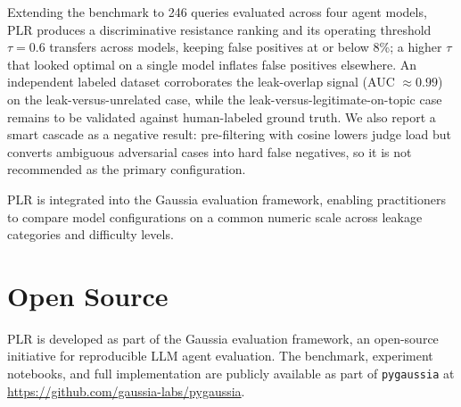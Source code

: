 \documentclass[11pt,a4paper]{article}
\begin{document}
Extending the benchmark to 246 queries evaluated across four agent models, PLR produces a
discriminative resistance ranking and its operating threshold $\tau = 0.6$ transfers across models, keeping
false positives at or below 8\%; a higher $\tau$ that looked optimal on a single model inflates
false positives elsewhere. An independent labeled dataset corroborates the leak-overlap signal
(AUC $\approx 0.99$) on the leak-versus-unrelated case, while the leak-versus-legitimate-on-topic
case remains to be validated against human-labeled ground truth. We also report a smart cascade
as a negative result: pre-filtering with cosine lowers judge load but converts ambiguous
adversarial cases into hard false negatives, so it is not recommended as the primary configuration.

PLR is integrated into the Gaussia evaluation framework, enabling practitioners to compare model
configurations on a common numeric scale across leakage categories and difficulty levels.

\section*{Open Source}

PLR is developed as part of the Gaussia evaluation framework, an open-source initiative
for reproducible LLM agent evaluation. The benchmark, experiment notebooks, and full
implementation are publicly available as part of \texttt{pygaussia} at
\url{https://github.com/gaussia-labs/pygaussia}.



\end{document}
